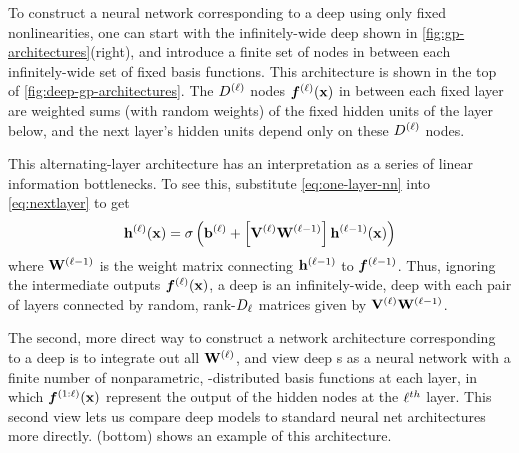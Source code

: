 \documentclass{article} %
\begin{document}
To construct a neural network corresponding to a deep \gp{} using only fixed nonlinearities, 
one can start with the infinitely-wide deep \gp{} shown in \cref{fig:gp-architectures}(right), and introduce a finite set of nodes in between each infinitely-wide set of fixed basis functions.
This architecture is shown in the top of \cref{fig:deep-gp-architectures}.
The $D^{(\ell)}$ nodes $\boldsymbol{f}^{(\ell)}({\bf{x}})$ in between each fixed layer are weighted sums (with random weights) of the fixed hidden units of the layer below, and the next layer's hidden units depend only on these $D^{(\ell)}$ nodes.

This alternating-layer architecture has an interpretation as a series of linear information bottlenecks.
To see this, substitute \cref{eq:one-layer-nn} into \cref{eq:nextlayer} to get
%
\begin{align}
{\bf{h}}^{(\ell)}({\bf{x}}) = \sigma \left( {\bf{b}}^{(\ell)} + \left[ \mathbf{V}^{(\ell)} \mathbf{W}^{(\ell-1)} \right] {\bf{h}}^{(\ell-1)}({\bf{x}}) \right)
\end{align}
%
where $\mathbf{W}^{(\ell-1)}$ is the weight matrix connecting ${\bf{h}}^{(\ell-1)}$ to $\boldsymbol{f}^{(\ell - 1)}$.
Thus, ignoring the intermediate outputs $\boldsymbol{f}^{(\ell)}({\bf{x}})$, a deep \gp{} is an infinitely-wide, deep \MLP{} with each pair of layers connected by random, rank-$D_\ell$ matrices given by $\mathbf{V}^{(\ell)} \mathbf{W}^{(\ell-1)}$.

The second, more direct way to construct a network architecture corresponding to a deep \gp{} is to integrate out all $\mathbf{W}^{(\ell)}$, and view deep \gp{}s as a neural network with a finite number of nonparametric, \gp{}-distributed basis functions at each layer, in which $\boldsymbol{f}^{(1:\ell)}({\bf{x}})$ represent the output of the hidden nodes at the $\ell^{th}$ layer.
This second view lets us compare deep \gp{} models to standard neural net architectures more directly.
(bottom) shows an example of this architecture.



\end{document}
